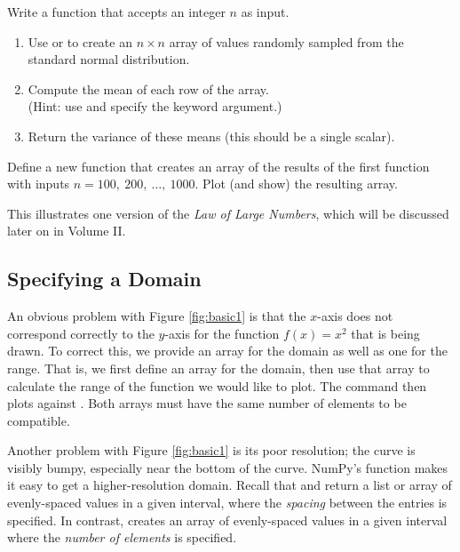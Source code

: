 \begin{problem} %
Write a function that accepts an integer $n$ as input.
\begin{enumerate}
\item Use  or  to create an $n\times n$ array of values randomly sampled from the standard normal distribution.
\item Compute the mean of each row of the array.
\\(Hint: use  and specify the  keyword argument.)
\item Return the variance of these means (this should be a single scalar).
\end{enumerate}
Define a new function that creates an array of the results of the first function with inputs $n = 100,\ 200,\ \ldots,\ 1000$.
%
Plot (and show) the resulting array.

This illustrates one version of the \emph{Law of Large Numbers}, which will be discussed later on in Volume II.
\end{problem}

\subsection*{Specifying a Domain} %

An obvious problem with Figure \ref{fig:basic1} is that the $x$-axis does not correspond correctly to the $y$-axis for the function $f(x) = x^2$ that is being drawn.
To correct this, we provide an array for the domain as well as one for the range.
That is, we first define an array  for the domain, then use that array to calculate the range  of the function we would like to plot.
The command  then plots  against .
Both arrays must have the same number of elements to be compatible.

Another problem with Figure \ref{fig:basic1} is its poor resolution; the curve is visibly bumpy, especially near the bottom of the curve.
NumPy's  function makes it easy to get a higher-resolution domain.
Recall that  and  return a list or array of evenly-spaced values in a given interval, where the \emph{spacing} between the entries is specified.
In contrast,  creates an array of evenly-spaced values in a given interval where the \emph{number of elements} is specified.

